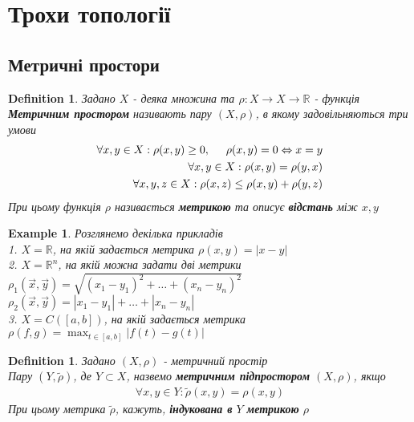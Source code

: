 \documentclass[a4paper, 14pt]{extarticle}
\def\huge{\displaystyle}
\theoremstyle{theoremdd}
\theoremstyle{theoremdd}
\newtheorem{definition}[theorem]{Definition}
\theoremstyle{theoremdd}
\theoremstyle{theoremdd}
\newtheorem{example}[theorem]{Example}
\theoremstyle{theoremdd}
\theoremstyle{theoremdd}
\theoremstyle{theoremdd}
\theoremstyle{theoremdd}
\begin{document}
\tableofcontents
\newpage

\section{Трохи топології}
\subsection{Метричні простори}
\begin{definition}
Задано $X$ - деяка множина та $\rho: X \to X \to \mathbb{R}$ - функція\\
\textbf{Метричним простором} називають пару $(X, \rho)$, в якому задовільняються три умови
\begin{align*}
\forall x,y \in X: \rho(x,y) \geq 0 ,\hspace{0.5cm} \rho(x,y) = 0 \Leftrightarrow x = y \\
\forall x,y \in X: \rho(x,y) = \rho(y,x) \\
\forall x,y,z \in X: \rho(x,z) \leq \rho(x,y) + \rho(y,z)
\end{align*}
При цьому функція $\rho$ називається \textbf{метрикою} та описує \textbf{відстань} між $x,y$
\end{definition}

\begin{example}
Розглянемо декілька прикладів\\
1. $X = \mathbb{R}$, на якій задається метрика $\rho(x,y) = |x-y|$ \bigskip \\
2. $X = \mathbb{R}^n$, на якій можна задати дві метрики\\
$\rho_1(\vec{x}, \vec{y}) = \sqrt{(x_1-y_1)^2 + \dots + (x_n-y_n)^2}$ \\ $\rho_2(\vec{x}, \vec{y}) = |x_1-y_1|+\dots+|x_n-y_n|$
\bigskip \\
3. $X = C([a,b])$, на якій задається метрика $\huge \rho(f,g) = \max_{t \in [a,b]} |f(t)-g(t)|$
\end{example}

\begin{definition}
Задано $(X,\rho)$ - метричний простір\\
Пару $(Y,\tilde{\rho})$, де $Y \subset X$, назвемо \textbf{метричним підпростором} $(X,\rho)$, якщо
\begin{align*}
\forall x,y \in Y: \tilde{\rho}(x,y) = \rho(x,y)
\end{align*}
При цьому метрика $\tilde{\rho}$, кажуть, \textbf{індукована в} $Y$ \textbf{метрикою} $\rho$
\end{definition}
\end{document}
